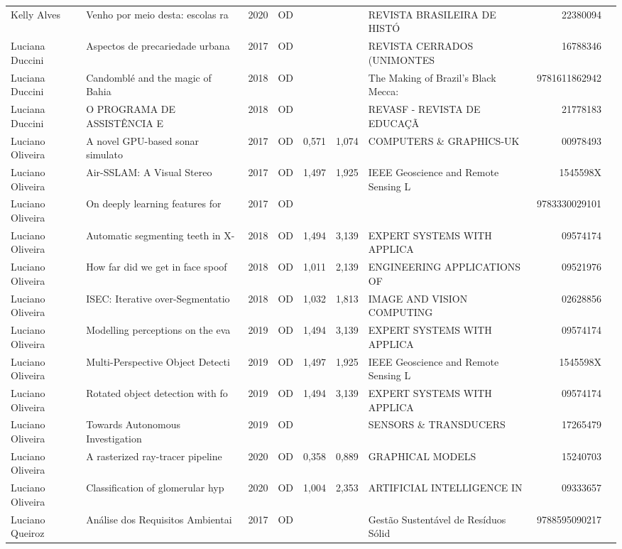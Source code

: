 \documentclass[12pt,brazil]{article}\usepackage[]{graphicx}\usepackage[]{xcolor}
\begin{document}
\begin{longtable}{lllrrllrr}
Kelly Alves & Venho por meio desta: escolas ra & 2020 & OD &  &  & REVISTA BRASILEIRA DE HISTÓ & 22380094 \\
Luciana Duccini & Aspectos de precariedade urbana  & 2017 & OD &  &  & REVISTA CERRADOS (UNIMONTES & 16788346 \\
Luciana Duccini & Candomblé and the magic of Bahia & 2018 & OD &  &  & The Making of Brazil’s Black Mecca:  & 9781611862942 \\
Luciana Duccini & O PROGRAMA DE ASSISTÊNCIA E & 2018 & OD &  &  & REVASF - REVISTA DE EDUCAÇÃ & 21778183 \\
Luciano Oliveira & A novel GPU-based sonar simulato & 2017 & OD & 0,571 & 1,074 & COMPUTERS \& GRAPHICS-UK & 00978493 \\
Luciano Oliveira & Air-SSLAM: A Visual Stereo  & 2017 & OD & 1,497 & 1,925 & IEEE Geoscience and Remote Sensing L & 1545598X \\
Luciano Oliveira & On deeply learning features for  & 2017 & OD &  &  &  & 9783330029101 \\
Luciano Oliveira & Automatic segmenting teeth in X- & 2018 & OD & 1,494 & 3,139 & EXPERT SYSTEMS WITH APPLICA & 09574174 \\
Luciano Oliveira & How far did we get in face spoof & 2018 & OD & 1,011 & 2,139 & ENGINEERING APPLICATIONS OF & 09521976 \\
Luciano Oliveira & ISEC: Iterative over-Segmentatio & 2018 & OD & 1,032 & 1,813 & IMAGE AND VISION COMPUTING & 02628856 \\
Luciano Oliveira & Modelling perceptions on the eva & 2019 & OD & 1,494 & 3,139 & EXPERT SYSTEMS WITH APPLICA & 09574174 \\
Luciano Oliveira & Multi-Perspective Object Detecti & 2019 & OD & 1,497 & 1,925 & IEEE Geoscience and Remote Sensing L & 1545598X \\
Luciano Oliveira & Rotated object detection with fo & 2019 & OD & 1,494 & 3,139 & EXPERT SYSTEMS WITH APPLICA & 09574174 \\
Luciano Oliveira & Towards Autonomous Investigation & 2019 & OD &  &  & SENSORS \& TRANSDUCERS & 17265479 \\
Luciano Oliveira & A rasterized ray-tracer pipeline & 2020 & OD & 0,358 & 0,889 & GRAPHICAL MODELS & 15240703 \\
Luciano Oliveira & Classification of glomerular hyp & 2020 & OD & 1,004 & 2,353 & ARTIFICIAL INTELLIGENCE IN  & 09333657 \\
Luciano Queiroz & Análise dos Requisitos Ambientai & 2017 & OD &  &  & Gestão Sustentável de Resíduos Sólid & 9788595090217 \\

\end{longtable}
\end{document}
